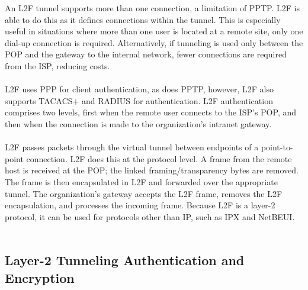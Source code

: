 \documentclass[10pt,a4paper]{article}
\begin{document}
\begin{itemize}
\begin{itemize}
\linebreak

An L2F tunnel supports more than one connection, a limitation of PPTP. L2F is
able to do this as it defines connections within the tunnel. This is especially useful
in situations where more than one user is located at a remote site, only one
dial-up connection is required. Alternatively, if tunneling is used only between the
POP and the gateway to the internal network, fewer connections are required
from the ISP, reducing costs.
\\
\\
L2F uses PPP for client authentication, as does PPTP, however, L2F also
supports TACACS+ and RADIUS for authentication. L2F authentication
comprises two levels, first when the remote user connects to the ISP’s POP, and
then when the connection is made to the organization’s intranet gateway.
\\
\\
L2F passes packets through the virtual tunnel between endpoints of a
point-to-point connection. L2F does this at the protocol level. A frame from the
remote host is received at the POP; the linked framing/transparency bytes are
removed. The frame is then encapsulated in L2F and forwarded over the
appropriate tunnel. The organization’s gateway accepts the L2F frame, removes
the L2F encapsulation, and processes the incoming frame. Because L2F is a
layer-2 protocol, it can be used for protocols other than IP, such as IPX and
NetBEUI.
\\
\\
\subsection{Layer-2 Tunneling Authentication and Encryption}


\end{itemize}
\end{itemize}
\end{document}
